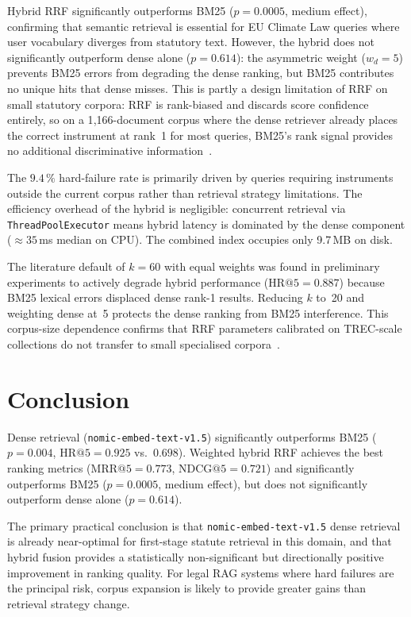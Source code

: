 \documentclass[conference]{IEEEtran}
\makeatletter
\newcommand{\nomic}{\texttt{nomic-embed-text-v1.5}\xspace}
\newcommand{\HR}[1]{\mathrm{HR}@{#1}}
\newcommand{\MRR}[1]{\mathrm{MRR}@{#1}}
\newcommand{\NDCG}[1]{\mathrm{NDCG}@{#1}}
\makeatother
\begin{document}
Hybrid RRF significantly outperforms BM25 ($p{=}0.0005$, medium
effect), confirming that semantic retrieval is essential for EU Climate
Law queries where user vocabulary diverges from statutory text.
However, the hybrid does not significantly outperform dense alone
($p{=}0.614$): the asymmetric weight ($w_d{=}5$) prevents BM25 errors
from degrading the dense ranking, but BM25 contributes no unique hits
that dense misses.
This is partly a design limitation of RRF on small statutory corpora:
RRF is rank-biased and discards score confidence entirely, so on a
1{,}166-document corpus where the dense retriever already places the
correct instrument at rank~1 for most queries, BM25's rank signal
provides no additional discriminative information~\cite{18}.

The $9.4\,\%$ hard-failure rate is primarily driven by queries
requiring instruments outside the current corpus rather than retrieval
strategy limitations.
The efficiency overhead of the hybrid is negligible: concurrent
retrieval via \texttt{ThreadPoolExecutor} means hybrid latency is
dominated by the dense component (${\approx}35$\,ms median on CPU).
The combined index occupies only 9.7\,MB on disk.

The literature default of $k{=}60$ with equal weights was found in
preliminary experiments to actively degrade hybrid performance
($\HR{5}{=}0.887$) because BM25 lexical errors displaced dense rank-1
results.
Reducing $k$ to~20 and weighting dense at~5 protects the dense
ranking from BM25 interference.
This corpus-size dependence confirms that RRF parameters calibrated
on TREC-scale collections do not transfer to small specialised
corpora~\cite{18}.

\section{Conclusion}

Dense retrieval (\nomic) significantly outperforms BM25
($p{=}0.004$, $\HR{5}{=}0.925$ vs.\ $0.698$).
Weighted hybrid RRF achieves the best ranking metrics ($\MRR{5}{=}0.773$,
$\NDCG{5}{=}0.721$) and significantly outperforms BM25
($p{=}0.0005$, medium effect), but does not significantly outperform
dense alone ($p{=}0.614$).

The primary practical conclusion is that \nomic dense retrieval is
already near-optimal for first-stage statute retrieval in this domain,
and that hybrid fusion provides a statistically non-significant but
directionally positive improvement in ranking quality.
For legal RAG systems where hard failures are the principal risk,
corpus expansion is likely to provide greater gains than retrieval
strategy change.
\end{document}
